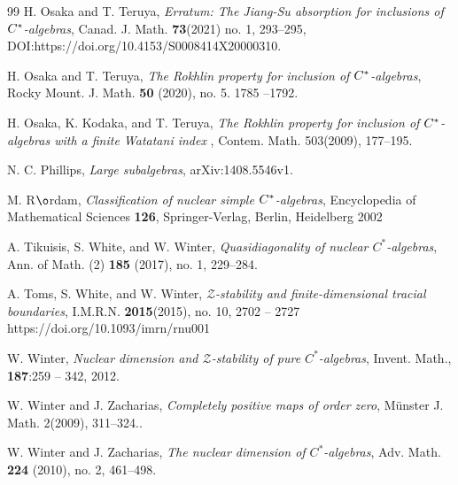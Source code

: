 \documentclass[12pt]{amsart}
\theoremstyle{plain}
\theoremstyle{definition}
\newcommand{\mc}{\mathcal}
\numberwithin{equation}{section}
\begin{document}
\begin{thebibliography}{99}
H. Osaka and  T. Teruya, \emph{Erratum: The Jiang-Su absorption for inclusions of $C\sp*$-algebras},  Canad. J. Math. {\bf 73}(2021)  no. 1, 293--295, DOI:https://doi.org/10.4153/S0008414X20000310.

H. Osaka and T. Teruya, \emph{The Rokhlin property for inclusion of $C\sp*$-algebras}, Rocky Mount. J. Math. {\bf 50} (2020), no. 5. 1785 --1792. 

 H. Osaka, K. Kodaka, and T. Teruya,  \emph{The Rokhlin property for inclusion of $C\sp*$-algebras with a finite Watatani index }, Contem. Math.  503(2009), 177--195. 

 N. C. Phillips, \emph{Large subalgebras}, arXiv:1408.5546v1. 

 M. R$\o$rdam, \emph{Classification of nuclear simple $C\sp*$-algebras},  Encyclopedia of Mathematical Sciences {\bf126}, Springer-Verlag, Berlin, Heidelberg 2002


A. Tikuisis, S. White, and W. Winter, \emph{Quasidiagonality of nuclear $C^*$-algebras}, Ann. of Math. (2) \textbf{185} (2017), no. 1, 229–284.

 A. Toms, S. White, and W. Winter, \emph{$\mc{Z}$-stability and finite-dimensional tracial boundaries}, I.M.R.N. {\bf 2015}(2015), no. 10, 2702 -- 2727 https://doi.org/10.1093/imrn/rnu001

 W. Winter,   \emph{Nuclear dimension and $\mc{Z}$-stability of pure $C^*$-algebras}, Invent. Math., {\bf187}:259 -- 342, 2012. 

W. Winter and J. Zacharias, \emph{Completely positive maps of order zero}, M\"unster J. Math. 2(2009), 311--324.. 

W. Winter and J. Zacharias, \emph{The nuclear dimension of $C^*$-algebras}, Adv. Math. \textbf{224} (2010), no. 2, 461–498.







\end{thebibliography}
\end{document}
